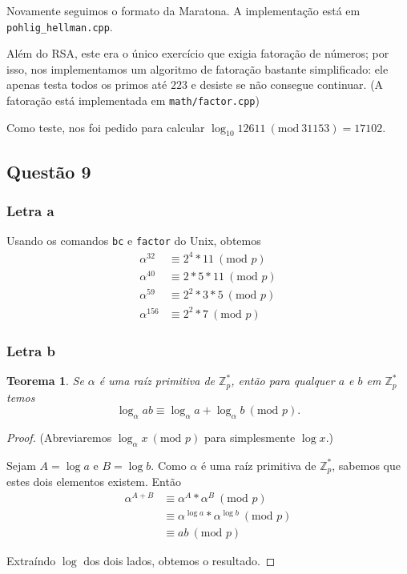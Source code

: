 \documentclass{article}
\newtheorem{theorem}{Teorema}
\renewcommand{\mod}[1]{ \ (\textrm{mod } #1) }
\begin{document}
Novamente seguimos o formato da Maratona.
A implementação está em \verb"pohlig_hellman.cpp".

Além do RSA, este era o único exercício que exigia fatoração de números;
por isso, nos implementamos um algoritmo de fatoração bastante simplificado:
ele apenas testa todos os primos até $223$ e desiste se não consegue continuar.
(A fatoração está implementada em \verb"math/factor.cpp")

Como teste, nos foi pedido para calcular $\log_{10} 12611\ (\mathrm{mod}\ 31153) = 17102$.

\subsection{Questão 9}

\subsubsection{Letra a}

Usando os comandos \verb"bc" e \verb"factor" do Unix, obtemos
\begin{align*}
    \alpha^{32} &\equiv 2^4 * 11 \mod{p} \\
    \alpha^{40} &\equiv 2*5*11 \mod{p} \\
    \alpha^{59} &\equiv 2^2*3*5 \mod{p} \\
    \alpha^{156} &\equiv 2^2*7 \mod{p}
\end{align*}

\subsubsection{Letra b}

\begin{theorem}
    Se $\alpha$ é uma raíz primitiva de $\mathbb Z_p^*$,
    então para qualquer $a$ e $b$ em $\mathbb Z_p^*$ temos
    \begin{equation*}
        \log_\alpha ab \equiv \log_\alpha a + \log_\alpha b \mod{p}.
    \end{equation*}
\end{theorem}
\begin{proof}
    (Abreviaremos $\log_\alpha x \mod{p}$ para simplesmente $\log x$.)

    Sejam $A = \log a$ e $B = \log b$.
    Como $\alpha$ é uma raíz primitiva de $\mathbb Z_p^*$,
    sabemos que estes dois elementos existem.
    Então
    \begin{align*}
        \alpha^{A + B} &\equiv \alpha^A*\alpha^B \mod{p} \\
                       &\equiv \alpha^{\log a}*\alpha^{\log b} \mod{p} \\
                       &\equiv ab \mod{p}
    \end{align*}

    Extraíndo $\log$ dos dois lados, obtemos o resultado.
\end{proof}
\end{document}
